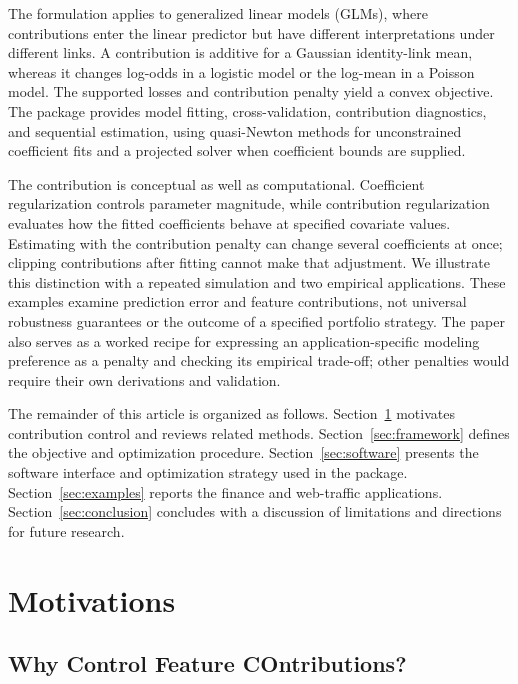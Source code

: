 \documentclass[article,shortnames,nofooter]{jss}
\begin{document}
The formulation applies to generalized linear models (GLMs), where contributions enter the linear predictor but have different interpretations under different links. A contribution is additive for a Gaussian identity-link mean, whereas it changes log-odds in a logistic model or the log-mean in a Poisson model. The supported losses and contribution penalty yield a convex objective. The  package provides model fitting, cross-validation, contribution diagnostics, and sequential estimation, using quasi-Newton methods for unconstrained coefficient fits and a projected solver when coefficient bounds are supplied.

The contribution is conceptual as well as computational. Coefficient regularization controls parameter magnitude, while contribution regularization evaluates how the fitted coefficients behave at specified covariate values. Estimating with the contribution penalty can change several coefficients at once; clipping contributions after fitting cannot make that adjustment. We illustrate this distinction with a repeated simulation and two empirical applications. These examples examine prediction error and feature contributions, not universal robustness guarantees or the outcome of a specified portfolio strategy. The paper also serves as a worked recipe for expressing an application-specific modeling preference as a penalty and checking its empirical trade-off; other penalties would require their own derivations and validation.

The remainder of this article is organized as follows. Section~\ref{sec:motivate} motivates contribution control and reviews related methods. Section~\ref{sec:framework} defines the objective and optimization procedure. Section~\ref{sec:software} presents the software interface and optimization strategy used in the  package. Section~\ref{sec:examples} reports the finance and web-traffic applications. Section~\ref{sec:conclusion} concludes with a discussion of limitations and directions for future research.

\section{Motivations}\label{sec:motivate}

\subsection{Why Control Feature COntributions?}
\end{document}
